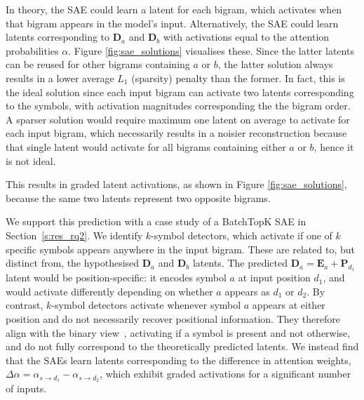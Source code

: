 In theory, the SAE could learn a latent for each bigram, which activates when that bigram appears in the model's input. 
Alternatively, the SAE could learn latents corresponding to $\boldsymbol D_a$ and $\boldsymbol D_b$ with activations equal to the attention probabilities $\alpha$.
Figure \ref{fig:sae_solutions} visualises these.
Since the latter latents can be reused for other bigrams containing $a$ or $b$, the latter solution always results in a lower average $L_1$ (sparsity) penalty than the former. In fact, this is the ideal solution since each input bigram can activate two latents corresponding to the symbols, with activation magnitudes corresponding the the bigram order. A sparser solution would require maximum one latent on average to activate for each input bigram, which necessarily results in a noisier reconstruction because that single latent would activate for all bigrams containing either $a$ or $b$, hence it is not ideal.

This results in graded latent activations, as shown in Figure \ref{fig:sae_solutions}, because the same two latents represent two opposite bigrams.


We support this prediction with a case study of a BatchTopK SAE in Section~\ref{s:res_rq2}. We identify $k$-symbol detectors, which activate if one of $k$ specific symbols appears anywhere in the input bigram. These are related to, but distinct from, the hypothesised $\boldsymbol{D}_a$ and $\boldsymbol{D}_b$ latents. The predicted $\boldsymbol{D}_a = \boldsymbol{E}_a + \boldsymbol{P}_{d_1}$ latent would be position-specific: it encodes symbol $a$ at input position $d_1$, and would activate differently depending on whether $a$ appears as $d_1$ or $d_2$. By contrast, $k$-symbol detectors activate whenever symbol $a$ appears at either position and do not necessarily recover positional information. They therefore align with the binary view~\citep{quirke2025binary, paulo2024automatically}, activating if a symbol is present and not otherwise, and do not fully correspond to the theoretically predicted latents. We instead find that the SAEs learn latents corresponding to the difference in attention weights, $\Delta\alpha = \alpha_{s \to d_1} - \alpha_{s \to d_2}$, which exhibit graded activations for a significant number of inputs.


